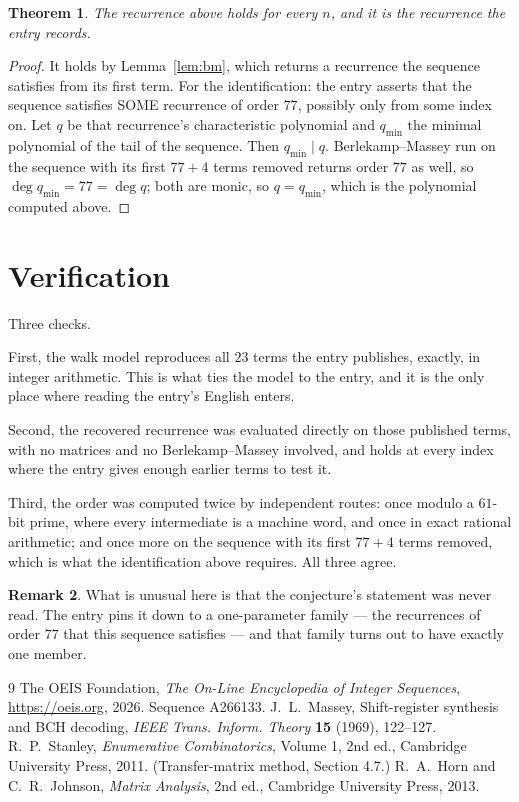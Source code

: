 \documentclass[11pt,a4paper]{article}
\theoremstyle{plain}
\newtheorem{theorem}{Theorem}
\theoremstyle{definition}
\newtheorem{remark}[theorem]{Remark}
\begin{document}
\begin{theorem}
The recurrence above holds for every $n$, and it is the recurrence the entry records.
\end{theorem}

\begin{proof}
It holds by Lemma~\ref{lem:bm}, which returns a recurrence the sequence satisfies from its
first term. For the identification: the entry asserts that the sequence satisfies SOME
recurrence of order $77$, possibly only from some index on. Let $q$ be that recurrence's
characteristic polynomial and $q_{\min}$ the minimal polynomial of the tail of the sequence.
Then $q_{\min}\mid q$. Berlekamp--Massey run on the sequence with its first $77+4$ terms
removed returns order $77$ as well, so $\deg q_{\min}=77=\deg q$; both are monic, so
$q=q_{\min}$, which is the polynomial computed above.
\end{proof}

\section{Verification}

Three checks.

First, the walk model reproduces all $23$ terms the entry publishes, exactly, in integer
arithmetic. This is what ties the model to the entry, and it is the only place where reading
the entry's English enters.

Second, the recovered recurrence was evaluated directly on those published terms, with no
matrices and no Berlekamp--Massey involved, and holds at every index where the entry gives
enough earlier terms to test it.

Third, the order was computed twice by independent routes: once modulo a $61$-bit prime, where
every intermediate is a machine word, and once in exact rational arithmetic; and once more on
the sequence with its first $77+4$ terms removed, which is what the identification above
requires. All three agree.

\begin{remark}
What is unusual here is that the conjecture's statement was never read. The entry pins it down
to a one-parameter family --- the recurrences of order $77$ that this sequence satisfies
--- and that family turns out to have exactly one member.
\end{remark}

\begin{thebibliography}{9}
 The OEIS Foundation, \emph{The On-Line Encyclopedia of Integer
Sequences}, \url{https://oeis.org}, 2026. Sequence A266133.
 J.~L.~Massey, Shift-register synthesis and BCH decoding, \emph{IEEE
Trans. Inform. Theory} \textbf{15} (1969), 122--127.
 R.~P.~Stanley, \emph{Enumerative Combinatorics}, Volume 1, 2nd ed.,
Cambridge University Press, 2011. (Transfer-matrix method, Section 4.7.)
 R.~A.~Horn and C.~R.~Johnson, \emph{Matrix Analysis}, 2nd ed., Cambridge
University Press, 2013.
\end{thebibliography}
\end{document}
